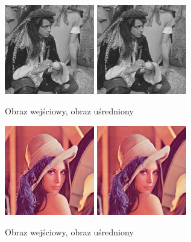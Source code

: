 \documentclass[final,a4paper,openany,12pt]{mwbk}
\begin{document}
\begin{figure}[H]
	\begin{center}
		\includegraphics[width=0.35\textwidth]{pirate_gray}
		\includegraphics[width=0.35\textwidth]{pirate_gray_lowpassAvg_result}
	\end{center}
	\caption{Obraz wejściowy, obraz uśredniony}
\end{figure}

\begin{figure}[H]
	\begin{center}
		\includegraphics[width=0.35\textwidth]{lena_color}
		\includegraphics[width=0.35\textwidth]{lena_color_lowpassAvg_result}
	\end{center}
	\caption{Obraz wejściowy, obraz uśredniony}
\end{figure}
\end{document}
